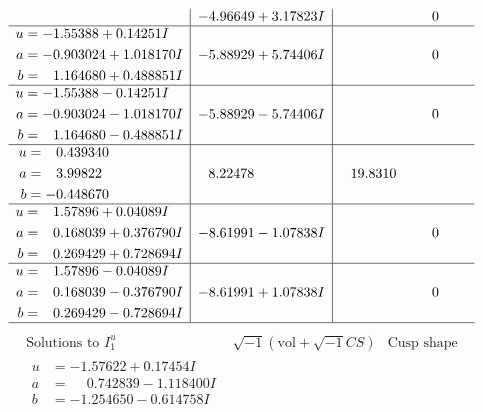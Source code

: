 \documentclass[1p]{elsarticle_modified}
\theoremstyle{definition}
\newcommand{\I}{\sqrt{-1}}
\begin{document}
$$\begin{array}{c|c|c}
 & -4.96649 + 3.17823 I & \phantom{-0.000000 } 0 \\ \hline\begin{aligned}
u &= -1.55388 + 0.14251 I \\
a &= -0.903024 + 1.018170 I \\
b &= \phantom{-}1.164680 + 0.488851 I\end{aligned}
 & -5.88929 + 5.74406 I & \phantom{-0.000000 } 0 \\ \hline\begin{aligned}
u &= -1.55388 - 0.14251 I \\
a &= -0.903024 - 1.018170 I \\
b &= \phantom{-}1.164680 - 0.488851 I\end{aligned}
 & -5.88929 - 5.74406 I & \phantom{-0.000000 } 0 \\ \hline\begin{aligned}
u &= \phantom{-}0.439340\phantom{ +0.000000I} \\
a &= \phantom{-}3.99822\phantom{ +0.000000I} \\
b &= -0.448670\phantom{ +0.000000I}\end{aligned}
 & \phantom{-}8.22478\phantom{ +0.000000I} & \phantom{-}19.8310\phantom{ +0.000000I} \\ \hline\begin{aligned}
u &= \phantom{-}1.57896 + 0.04089 I \\
a &= \phantom{-}0.168039 + 0.376790 I \\
b &= \phantom{-}0.269429 + 0.728694 I\end{aligned}
 & -8.61991 - 1.07838 I & \phantom{-0.000000 } 0 \\ \hline\begin{aligned}
u &= \phantom{-}1.57896 - 0.04089 I \\
a &= \phantom{-}0.168039 - 0.376790 I \\
b &= \phantom{-}0.269429 - 0.728694 I\end{aligned}
 & -8.61991 + 1.07838 I & \phantom{-0.000000 } 0\\
 \hline 
 \end{array}$$\newpage$$\begin{array}{c|c|c}  
\text{Solutions to }I^u_{1}& \I (\text{vol} + \sqrt{-1}CS) & \text{Cusp shape}\\
 \hline 
\begin{aligned}
u &= -1.57622 + 0.17454 I \\
a &= \phantom{-}0.742839 - 1.118400 I \\
b &= -1.254650 - 0.614758 I\end{aligned}

\end{array}$$
\end{document}
